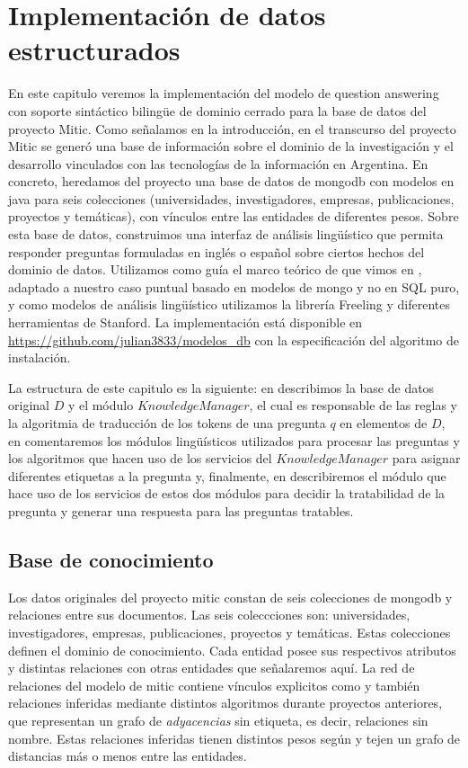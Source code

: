 \chapter{Implementación de datos estructurados}
\label{chap:4}
\horrible
En este capitulo veremos la implementación del modelo de question answering con soporte sintáctico bilingüe de dominio cerrado para la base de datos del proyecto Mitic. Como señalamos en la introducción, en el transcurso del proyecto Mitic se generó una base de información sobre el dominio de la investigación y el desarrollo vinculados con las tecnologías de la información en Argentina. En concreto, heredamos del proyecto una base de datos de mongodb con modelos en java para seis colecciones (universidades, investigadores, empresas, publicaciones, proyectos y temáticas), con vínculos entre las entidades de diferentes pesos. Sobre esta base de datos, construimos una interfaz de análisis lingüístico que permita responder preguntas formuladas en inglés o español sobre ciertos hechos del dominio de datos. Utilizamos como guía el marco teórico de \cite{QADB1} que vimos en , adaptado a nuestro caso puntual basado en modelos de mongo y no en SQL puro, y como modelos de análisis lingüístico utilizamos la librería Freeling y diferentes herramientas de Stanford. La implementación está disponible en \url{https://github.com/julian3833/modelos_db} con la especificación del algoritmo de instalación. 

La estructura de este capitulo es la siguiente: en  describimos la base de datos original $D$ y el módulo $KnowledgeManager$, el cual es responsable de las reglas y la algoritmia de traducción de los tokens de una pregunta $q$ en elementos de $D$, en  comentaremos los módulos lingüísticos utilizados para procesar las preguntas y los algoritmos que hacen uso de los servicios del $KnowledgeManager$ para asignar diferentes etiquetas a la pregunta y, finalmente, en  describiremos el módulo que hace uso de los servicios de estos dos módulos para decidir la tratabilidad de la pregunta y generar una respuesta para las preguntas tratables.

\section{Base de conocimiento}
\label{sec:grafo-mitic}

Los datos originales del proyecto mitic constan de seis colecciones de mongodb y relaciones entre sus documentos. Las seis coleccciones son: universidades, investigadores, empresas, publicaciones, proyectos y temáticas. Estas colecciones definen el dominio de conocimiento. Cada entidad posee sus respectivos atributos y distintas relaciones con otras entidades que señalaremos aquí. La red de relaciones del modelo de mitic contiene vínculos explicitos como  y también relaciones inferidas mediante distintos algoritmos durante proyectos anteriores, que representan un grafo de \textit{adyacencias} sin etiqueta, es decir, relaciones sin nombre. Estas relaciones inferidas tienen distintos pesos según y tejen un grafo de distancias más o menos  entre las entidades. 

